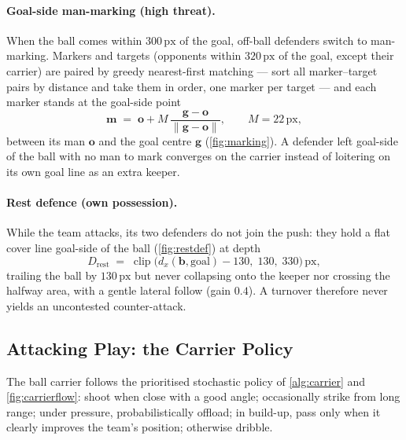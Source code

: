 \documentclass[10pt,twocolumn]{article}
\newcommand{\px}{\ensuremath{\,\mathrm{px}}}
\begin{document}
\paragraph{Goal-side man-marking (high threat).} When the ball comes within
$300\px$ of the goal, off-ball defenders switch to man-marking. Markers and
targets (opponents within $320\px$ of the goal, except their carrier) are
paired by greedy nearest-first matching --- sort all marker--target pairs
by distance and take them in order, one marker per target --- and each
marker stands at the goal-side point
\begin{equation}\label{eq:mark}
\mathbf m \;=\; \mathbf o + M\,\frac{\mathbf g - \mathbf o}{\lVert \mathbf g - \mathbf o \rVert},
\qquad M = 22\px,
\end{equation}
between its man $\mathbf o$ and the goal centre $\mathbf g$
(\cref{fig:marking}). A defender left goal-side of the ball with no man to
mark converges on the carrier instead of loitering on its own goal line as
an extra keeper.

\paragraph{Rest defence (own possession).} While the team attacks, its two
defenders do not join the push: they hold a flat cover line goal-side of
the ball (\cref{fig:restdef}) at depth
\begin{equation}\label{eq:rest}
D_{\text{rest}} \;=\;
\operatorname{clip}\bigl(d_x(\mathbf b,\text{goal}) - 130,\; 130,\; 330\bigr)\px,
\end{equation}
trailing the ball by $130\px$ but never collapsing onto the keeper nor
crossing the halfway area, with a gentle lateral follow (gain $0.4$). A
turnover therefore never yields an uncontested counter-attack.

\subsection{Attacking Play: the Carrier Policy}\label{sec:attack}

The ball carrier follows the prioritised stochastic policy of
\cref{alg:carrier} and \cref{fig:carrierflow}: shoot when close with a
good angle; occasionally strike from long range; under pressure,
probabilistically offload; in build-up, pass only when it clearly improves
the team's position; otherwise dribble.
\end{document}
